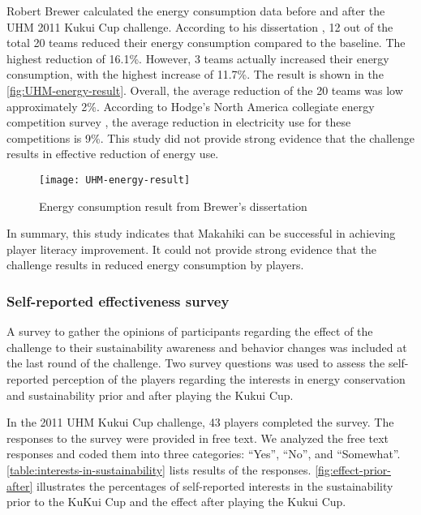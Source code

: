 Robert Brewer calculated the energy consumption data before and after the UHM 2011 Kukui Cup challenge. According to his dissertation \cite{csdl2-10-08}, 12 out of the total 20 teams reduced their energy
consumption compared to the baseline. The highest reduction of 16.1\%. However, 3 teams actually increased
their energy consumption, with the highest increase of 11.7\%. The result is shown in the \autoref{fig:UHM-energy-result}. Overall, the average reduction of the 20 teams was low \- approximately 2\%.  According to Hodge's North America collegiate energy competition survey \cite{Hodge2010}, the average reduction in electricity use for these competitions is 9\%. This study did not provide strong evidence that the challenge results in effective reduction of energy use.

\begin{figure}[ht!]
  \center
  \texttt{[image: UHM-energy-result]}
  \caption{Energy consumption result from Brewer's dissertation \cite{csdl2-10-08}}
  \label{fig:UHM-energy-result}
\end{figure}

In summary, this study indicates that Makahiki can be successful in achieving player literacy improvement. It could not provide strong evidence that the challenge results in reduced energy consumption by players. 

\subsubsection{Self-reported effectiveness survey}
\label{sec:player-self-reported-effectiveness-result}

A survey to gather the opinions of participants regarding the effect of the challenge to their sustainability awareness and behavior changes was included at the last round of the challenge. 
Two survey questions was used to assess the self-reported perception of the players regarding the interests in energy conservation and sustainability prior and after playing the Kukui Cup. 

In the 2011 UHM Kukui Cup challenge, 43 players completed the survey. The responses to the survey were provided in free text. We analyzed the free text responses and coded them into three categories: ``Yes'', ``No'', and ``Somewhat''. \autoref{table:interests-in-sustainability} lists results of the responses. \autoref{fig:effect-prior-after} illustrates the percentages of self-reported interests in the sustainability prior to the KuKui Cup and the effect after playing the Kukui Cup.

